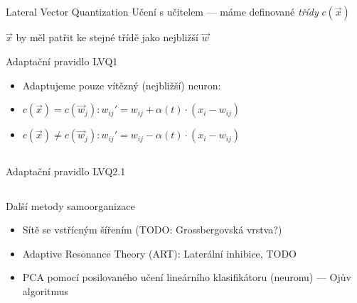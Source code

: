\documentclass{beamer}
\begin{document}
\subsection{}
\begin{frame}{Lateral Vector Quantization}
Učení s učitelem --- máme definované {\em třídy} $c(\vec x)$

$\vec x$ by měl patřit ke stejné třídě jako nejbližší $\vec w$

\begin{block}{Adaptační pravidlo LVQ1}
\begin{itemize}
\item Adaptujeme pouze vítězný (nejbližší) neuron:
\item $c(\vec x) = c(\vec w_j)\colon w_{ij}' = w_{ij} + \alpha(t) \cdot (x_i - w_{ij})$
\item $c(\vec x) \ne c(\vec w_j)\colon w_{ij}' = w_{ij} - \alpha(t) \cdot (x_i - w_{ij})$
\end{itemize}
\end{block}
\end{frame}

\subsection{}
\begin{frame}{Adaptační pravidlo LVQ2.1}
\end{frame}

\subsection{}
\begin{frame}{Další metody samoorganizace}
\begin{itemize}
\item Sítě se vstřícným šířením (TODO: Grossbergovská vrstva?)
\item Adaptive Resonance Theory (ART): Laterální inhibice, TODO
\item PCA pomocí posilovaného učení lineárního klasifikátoru (neuronu) --- Ojův algoritmus
\end{itemize}
\end{frame}
\end{document}
